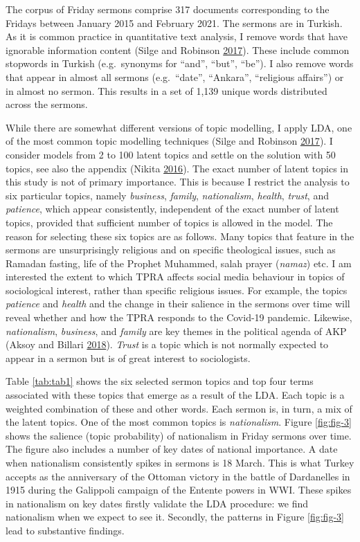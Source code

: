 \documentclass[
  12pt,
]{article}
\begin{document}
The corpus of Friday sermons comprise 317 documents corresponding to the Fridays between January 2015 and February 2021. The sermons are in Turkish. As it is common practice in quantitative text analysis, I remove words that have ignorable information content (Silge and Robinson \protect\hyperlink{ref-silge2017text}{2017}). These include common stopwords in Turkish (e.g.~synonyms for ``and'', ``but'', ``be''). I also remove words that appear in almost all sermons (e.g.~``date'', ``Ankara'', ``religious affairs'') or in almost no sermon. This results in a set of 1,139 unique words distributed across the sermons.

While there are somewhat different versions of topic modelling, I apply LDA, one of the most common topic modelling techniques (Silge and Robinson \protect\hyperlink{ref-silge2017text}{2017}). I consider models from 2 to 100 latent topics and settle on the solution with 50 topics, see also the appendix (Nikita \protect\hyperlink{ref-nikita2016select}{2016}). The exact number of latent topics in this study is not of primary importance. This is because I restrict the analysis to six particular topics, namely \emph{business}, \emph{family}, \emph{nationalism}, \emph{health}, \emph{trust}, and \emph{patience}, which appear consistently, independent of the exact number of latent topics, provided that sufficient number of topics is allowed in the model. The reason for selecting these six topics are as follows. Many topics that feature in the sermons are unsurprisingly religious and on specific theological issues, such as Ramadan fasting, life of the Prophet Muhammed, salah prayer (\emph{namaz}) etc. I am interested the extent to which TPRA affects social media behaviour in topics of sociological interest, rather than specific religious issues. For example, the topics \emph{patience} and \emph{health} and the change in their salience in the sermons over time will reveal whether and how the TPRA responds to the Covid-19 pandemic. Likewise, \emph{nationalism}, \emph{business}, and \emph{family} are key themes in the political agenda of AKP (Aksoy and Billari \protect\hyperlink{ref-aksoy2018political}{2018}). \emph{Trust} is a topic which is not normally expected to appear in a sermon but is of great interest to sociologists.

Table \ref{tab:tab1} shows the six selected sermon topics and top four terms associated with these topics that emerge as a result of the LDA. Each topic is a weighted combination of these and other words. Each sermon is, in turn, a mix of the latent topics. One of the most common topics is \emph{nationalism}. Figure \ref{fig:fig-3} shows the salience (topic probability) of nationalism in Friday sermons over time. The figure also includes a number of key dates of national importance. A date when nationalism consistently spikes in sermons is 18 March. This is what Turkey accepts as the anniversary of the Ottoman victory in the battle of Dardanelles in 1915 during the Galippoli campaign of the Entente powers in WWI. These spikes in nationalism on key dates firstly validate the LDA procedure: we find nationalism when we expect to see it. Secondly, the patterns in Figure \ref{fig:fig-3} lead to substantive findings.
\end{document}
